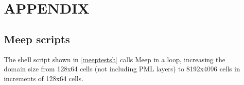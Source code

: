 
\chapter{APPENDIX} \label{ch:table appendix}







\section{Meep scripts}

The shell script shown in \autoref{meeptestsh} calls Meep in a loop, increasing the domain size from 128x64 cells (not including PML layers) to 8192x4096 cells in increments of 128x64 cells. 

